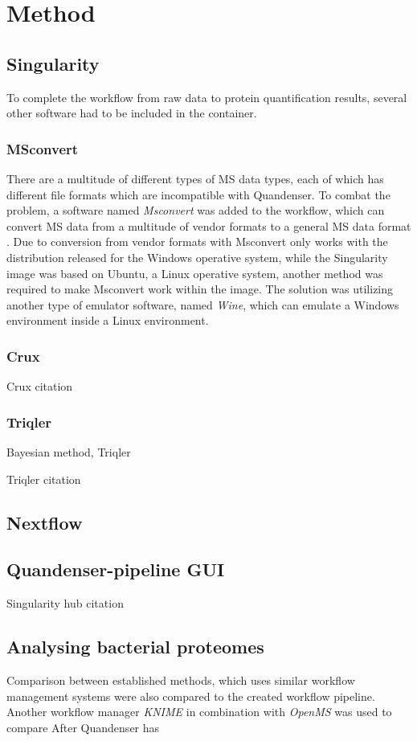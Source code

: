 \section{Method}


\subsection{Singularity}



To complete the workflow from raw data to protein quantification results, several other software had to be included in the container.

\subsubsection{MSconvert}

There are a multitude of different types of MS data types, each of which has different file formats which are incompatible with Quandenser. To combat the problem, a software named \textit{Msconvert} was added to the workflow, which can convert MS data from a multitude of vendor formats to a general MS data format \cite{proteowizard}. Due to conversion from vendor formats with Msconvert only works with the distribution released for the Windows operative system, while the Singularity image was based on Ubuntu, a Linux operative system, another method was required to make Msconvert work within the image. The solution was utilizing another type of emulator software, named \textit{Wine}, which can emulate a Windows environment inside a Linux environment.

\subsubsection{Crux}

Crux citation \cite{crux}

\subsubsection{Triqler}
Bayesian method, Triqler

Triqler citation \cite{triqler}

\subsection{Nextflow}


\subsection{Quandenser-pipeline GUI}

Singularity hub citation \cite{singularity-hub}


\subsection{Analysing bacterial proteomes}

Comparison between established methods, which uses similar workflow management systems were also compared to the created workflow pipeline. Another workflow manager \textit{KNIME} in combination with \textit{OpenMS} was used to compare
After Quandenser has
